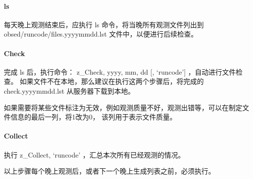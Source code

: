 \documentclass[a4paper,12pt]{article}
\begin{document}
\paragraph{ls} 每天晚上观测结束后，应执行 ls 命令，将当晚所有观测文件列出到 obsed/runcode/files.yyyymmdd.lst 
文件中，以便进行后续检查。

\paragraph{Check} 完成 ls 后，执行命令： z\_Check, yyyy, mm, dd {[}, `runcode'{]} ，自动进行文件检查。
如果文件不在本地，那么建议在执行这两个步骤后，将完成的 check.yyyymmdd.lst 从服务器下载到本地。

如果需要将某些文件标注为无效，例如观测质量不好，观测出错等，可以在制定文件信息的最后一列，将1改为0，
该列用于表示文件质量。

\paragraph{Collect} 执行 z\_Collect, `runcode' ，汇总本次所有已经观测的情况。

以上步骤每个晚上观测后，或者下一个晚上生成列表之前，必须执行。

\end{document}
